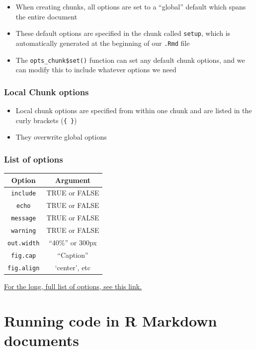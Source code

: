 \documentclass[]{article}
\providecommand{\tightlist}{%
  \setlength{\itemsep}{0pt}\setlength{\parskip}{0pt}}
\begin{document}
\begin{itemize}
\tightlist
\item
  When creating chunks, all options are set to a ``global'' default
  which spans the entire document
\item
  These default options are specified in the chunk called
  \texttt{setup}, which is automatically generated at the beginning of
  our \texttt{.Rmd} file
\item
  The \texttt{opts\_chunk\$set()} function can set any default chunk
  options, and we can modify this to include whatever options we need
\end{itemize}

\hypertarget{local-chunk-options}{%
\subsubsection{Local Chunk options}\label{local-chunk-options}}

\begin{itemize}
\tightlist
\item
  Local chunk options are specified from within one chunk and are listed
  in the curly brackets (\texttt{\{\ \}})
\item
  They overwrite global options
\end{itemize}

\hypertarget{list-of-options}{%
\subsubsection{List of options}\label{list-of-options}}

\begin{longtable}[]{@{}cc@{}}
\toprule
Option & Argument\tabularnewline
\midrule
\endhead
\texttt{include} & TRUE or FALSE\tabularnewline
\texttt{echo} & TRUE or FALSE\tabularnewline
\texttt{message} & TRUE or FALSE\tabularnewline
\texttt{warning} & TRUE or FALSE\tabularnewline
\texttt{out.width} & ``40\%'' or 300px\tabularnewline
\texttt{fig.cap} & ``Caption''\tabularnewline
\texttt{fig.align} & `center', etc\tabularnewline
\bottomrule
\end{longtable}

\href{https://yihui.name/knitr/options/\#plots}{For the long, full list
of options, see this link.}

\hypertarget{running-code-in-r-markdown-documents}{%
\section{Running code in R Markdown
documents}\label{running-code-in-r-markdown-documents}}
\end{document}
